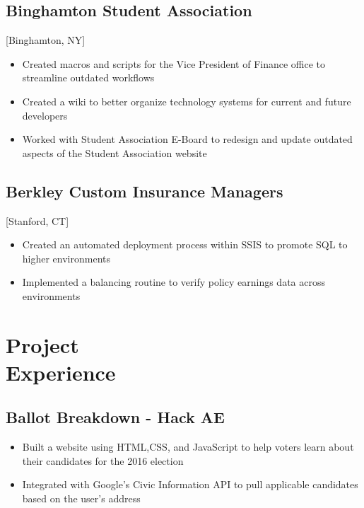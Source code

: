 \documentclass{mycv}
\begin{document}
\subsection{Binghamton Student Association}[Binghamton, NY]
\begin{positions}
\end{positions}

\begin{itemize}
  \item Created macros and scripts for the Vice President of Finance office to streamline outdated workflows
  \item Created a wiki to better organize technology systems for current and future developers
  \item Worked with Student Association E-Board to redesign and update outdated aspects of the Student Association website
\end{itemize}

\subsection{Berkley Custom Insurance Managers}[Stanford, CT]
\begin{positions}
\end{positions}

\begin{itemize}
  \item Created an automated deployment process within SSIS to promote SQL to higher environments
  \item Implemented a balancing routine to verify policy earnings data across environments
\end{itemize}

\section{Project  \\ Experience}
\subsection{Ballot Breakdown - Hack AE}
\begin{itemize}
  \item Built a website using HTML,CSS, and JavaScript to help voters learn about their candidates for the 2016 election
  \item Integrated with Google's Civic Information API to pull applicable candidates based on the user's address
\end{itemize}
\end{document}
